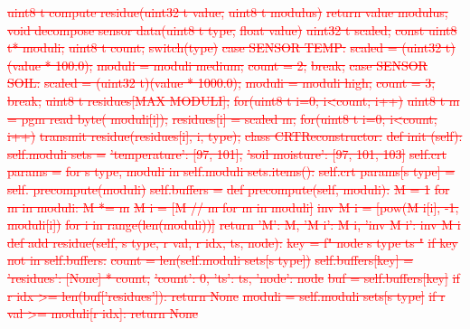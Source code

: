 \documentclass[pdflatex,sn-mathphys-num]{sn-jnl}
\theoremstyle{thmstyleone}
\theoremstyle{thmstyletwo}
\theoremstyle{thmstylethree}
\begin{document}
{\textcolor{red}{\sout{uint8 t compute residue(uint32 t value,}}
\textcolor{red}{\sout{uint8 t modulus)}}
\textcolor{red}{\sout{return value modulus;}}
\textcolor{red}{\sout{void decompose sensor data(uint8 t type,}}
\textcolor{red}{\sout{float value)}}
\textcolor{red}{\sout{uint32 t scaled;}}
\textcolor{red}{\sout{const uint8 t* moduli;}}
\textcolor{red}{\sout{uint8 t count;}}
\textcolor{red}{\sout{switch(type)}}
\textcolor{red}{\sout{case SENSOR TEMP:}}
\textcolor{red}{\sout{scaled = (uint32 t)(value * 100.0);}}
\textcolor{red}{\sout{moduli = moduli medium;}}
\textcolor{red}{\sout{count = 2;}}
\textcolor{red}{\sout{break;}}
\textcolor{red}{\sout{case SENSOR SOIL:}}
\textcolor{red}{\sout{scaled = (uint32 t)(value * 1000.0);}}
\textcolor{red}{\sout{moduli = moduli high;}}
\textcolor{red}{\sout{count = 3;}}
\textcolor{red}{\sout{break;}}
\textcolor{red}{\sout{uint8 t residues[MAX MODULI];}}
\textcolor{red}{\sout{for(uint8 t i=0; i<count; i++)}}
\textcolor{red}{\sout{uint8 t m = pgm read byte( moduli[i]);}}
\textcolor{red}{\sout{residues[i] = scaled m;}}
\textcolor{red}{\sout{for(uint8 t i=0; i<count; i++)}}
\textcolor{red}{\sout{transmit residue(residues[i], i, type);}}
\textcolor{red}{\sout{class CRTReconstructor:}}
\textcolor{red}{\sout{def init (self):}}
\textcolor{red}{\sout{self.moduli sets =}}
\textcolor{red}{\sout{'temperature': [97, 101],}}
\textcolor{red}{\sout{'soil moisture': [97, 101, 103]}}
\textcolor{red}{\sout{self.crt params =}}
\textcolor{red}{\sout{for s type, moduli in self.moduli sets.items():}}
\textcolor{red}{\sout{self.crt params[s type] = self. precompute(moduli)}}
\textcolor{red}{\sout{self.buffers =}}
\textcolor{red}{\sout{def precompute(self, moduli):}}
\textcolor{red}{\sout{M = 1}}
\textcolor{red}{\sout{for m in moduli: M *= m}}
\textcolor{red}{\sout{M i = [M // m for m in moduli]}}
\textcolor{red}{\sout{inv M i = [pow(M i[i], -1, moduli[i])}}
\textcolor{red}{\sout{for i in range(len(moduli))]}}
\textcolor{red}{\sout{return 'M': M, 'M i': M i, 'inv M i': inv M i}}
\textcolor{red}{\sout{def add residue(self, s type, r val, r idx, ts, node):}}
\textcolor{red}{\sout{key = f" node s type ts "}}
\textcolor{red}{\sout{if key not in self.buffers:}}
\textcolor{red}{\sout{count = len(self.moduli sets[s type])}}
\textcolor{red}{\sout{self.buffers[key] =}}
\textcolor{red}{\sout{'residues': [None] * count,}}
\textcolor{red}{\sout{'count': 0, 'ts': ts, 'node': node}}
\textcolor{red}{\sout{buf = self.buffers[key]}}
\textcolor{red}{\sout{if r idx >= len(buf['residues']): return None}}
\textcolor{red}{\sout{moduli = self.moduli sets[s type]}}
\textcolor{red}{\sout{if r val >= moduli[r idx]: return None}}
}
\end{document}
